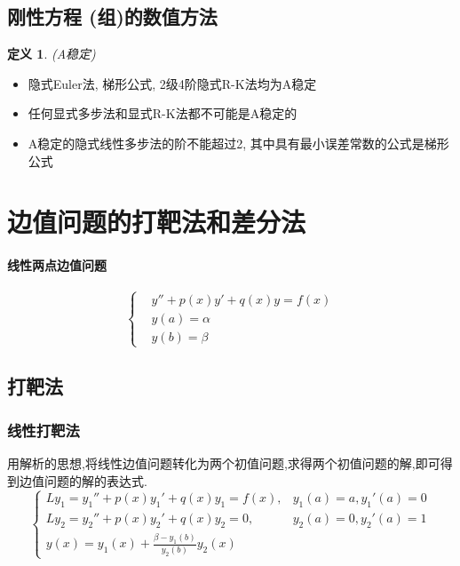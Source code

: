 \documentclass[twoside]{article}
\newtheorem{definition}{定义}[section]
\begin{document}
\subsection{刚性方程 (组)的数值方法}
\begin{definition}
  (A稳定)
\end{definition}
\begin{itemize}
    \item 隐式Euler法, 梯形公式, 2级4阶隐式R-K法均为A稳定
    \item 任何显式多步法和显式R-K法都不可能是A稳定的
    \item A稳定的隐式线性多步法的阶不能超过2, 其中具有最小误差常数的公式是梯形公式
\end{itemize}

\section{边值问题的打靶法和差分法}\label{sec:bian_zhi_wen_ti_de_da_ba_fa_he_chai_fen_fa_}
\paragraph{线性两点边值问题}
\begin{equation}
  \left\{
    \begin{aligned}
        & y'' + p(x)y' + q(x)y = f(x) \\
        & y(a) = \alpha \\
        & y(b)= \beta
    \end{aligned}
  \right.
\end{equation}
\subsection{打靶法}\label{sub:da_ba_fa_}
\subsubsection{线性打靶法}\label{ssub:xian_xing_da_ba_fa_}
  用解析的思想,将线性边值问题转化为两个初值问题,求得两个初值问题的解,即可得到边值问题的解的表达式.
  \begin{equation}
    \begin{cases}{}
      Ly_1=y_1'' + p(x)y_1' + q(x)y_1=f(x),&y_1(a)=a, y_1'(a)=0 \\
      Ly_2=y_2'' + p(x)y_2' + q(x)y_2=0,&y_2(a)=0, y_2'(a)=1 \\
      y(x) = y_1(x) + \frac{\beta - y_1(b)}{y_2(b)} y_2(x)
    \end{cases}
  \end{equation}
\end{document}
